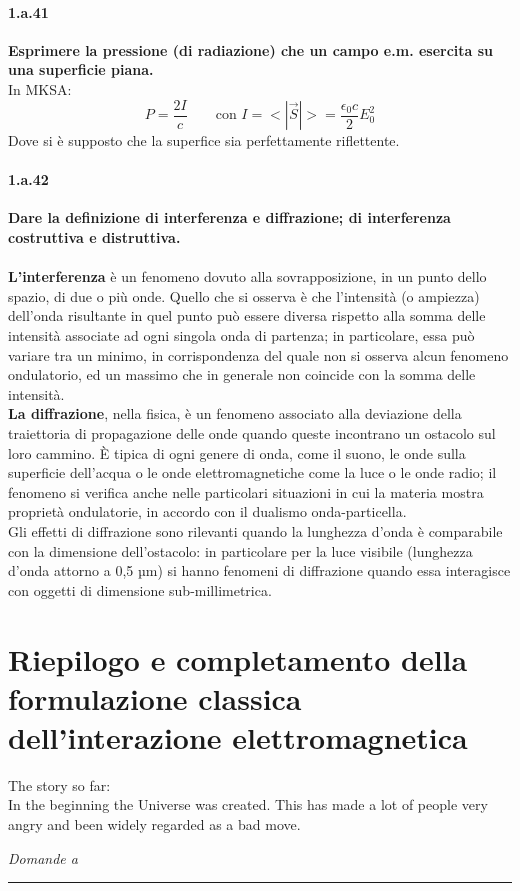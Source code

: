 \documentclass[twoside]{article}
\begin{document}
\paragraph{1.a.41} \textbf{Esprimere la pressione (di radiazione) che un campo e.m. esercita su una superficie piana.}\\
In MKSA:
\begin{equation}
    P=\frac{2I}{c} \qquad \text{con } I=<|\vec{S}|>=\frac{\epsilon_0 c}{2}E_0^2
\end{equation}
Dove si è supposto che la superfice sia perfettamente riflettente.\\ 
\paragraph{1.a.42} \textbf{Dare la definizione di interferenza e diffrazione; di interferenza costruttiva e
distruttiva.}\\
\\
\textbf{L'interferenza} è un fenomeno dovuto alla sovrapposizione, in un punto dello spazio, di due o più onde. Quello che si osserva è che l'intensità (o ampiezza) dell'onda risultante in quel punto può essere diversa rispetto alla somma delle intensità associate ad ogni singola onda di partenza; in particolare, essa può variare tra un minimo, in corrispondenza del quale non si osserva alcun fenomeno ondulatorio, ed un massimo che in generale non coincide con la somma delle intensità.\\
\textbf{La diffrazione}, nella fisica, è un fenomeno associato alla deviazione della traiettoria di propagazione delle onde quando queste incontrano un ostacolo sul loro cammino. È tipica di ogni genere di onda, come il suono, le onde sulla superficie dell'acqua o le onde elettromagnetiche come la luce o le onde radio; il fenomeno si verifica anche nelle particolari situazioni in cui la materia mostra proprietà ondulatorie, in accordo con il dualismo onda-particella.\\
Gli effetti di diffrazione sono rilevanti quando la lunghezza d'onda è comparabile con la dimensione dell'ostacolo: in particolare per la luce visibile (lunghezza d'onda attorno a 0,5 µm) si hanno fenomeni di diffrazione quando essa interagisce con oggetti di dimensione sub-millimetrica.




\newpage
\section{Riepilogo e completamento della formulazione classica dell'interazione elettromagnetica}
\epigraph{The story so far:\\ In the beginning the Universe was created.
This has made a lot of people very angry and been widely regarded as a bad move.}{}
\textit{Domande a}\rule{13.7 cm}{0.4pt}
\end{document}
